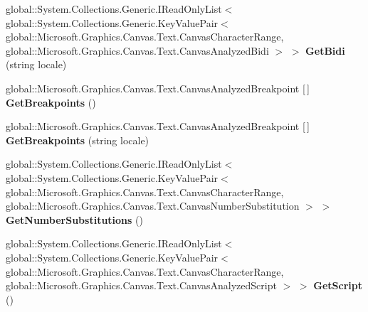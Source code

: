 \begin{DoxyCompactItemize}
global\+::\+System.\+Collections.\+Generic.\+I\+Read\+Only\+List$<$ global\+::\+System.\+Collections.\+Generic.\+Key\+Value\+Pair$<$ global\+::\+Microsoft.\+Graphics.\+Canvas.\+Text.\+Canvas\+Character\+Range, global\+::\+Microsoft.\+Graphics.\+Canvas.\+Text.\+Canvas\+Analyzed\+Bidi $>$ $>$ {\bfseries Get\+Bidi} (string locale)
\item 
\mbox{\label{interface_microsoft_1_1_graphics_1_1_canvas_1_1_text_1_1_i_canvas_text_analyzer_aae3059f7ac90b34a23ffa7061184bf59}} 
global\+::\+Microsoft.\+Graphics.\+Canvas.\+Text.\+Canvas\+Analyzed\+Breakpoint \mbox{[}$\,$\mbox{]} {\bfseries Get\+Breakpoints} ()
\item 
\mbox{\label{interface_microsoft_1_1_graphics_1_1_canvas_1_1_text_1_1_i_canvas_text_analyzer_aed1856403ffb2ff3f563c0010aeea194}} 
global\+::\+Microsoft.\+Graphics.\+Canvas.\+Text.\+Canvas\+Analyzed\+Breakpoint \mbox{[}$\,$\mbox{]} {\bfseries Get\+Breakpoints} (string locale)
\item 
\mbox{\label{interface_microsoft_1_1_graphics_1_1_canvas_1_1_text_1_1_i_canvas_text_analyzer_a6d7def9fe8d3b06fcfe8ff52672a9ded}} 
global\+::\+System.\+Collections.\+Generic.\+I\+Read\+Only\+List$<$ global\+::\+System.\+Collections.\+Generic.\+Key\+Value\+Pair$<$ global\+::\+Microsoft.\+Graphics.\+Canvas.\+Text.\+Canvas\+Character\+Range, global\+::\+Microsoft.\+Graphics.\+Canvas.\+Text.\+Canvas\+Number\+Substitution $>$ $>$ {\bfseries Get\+Number\+Substitutions} ()
\item 
\mbox{\label{interface_microsoft_1_1_graphics_1_1_canvas_1_1_text_1_1_i_canvas_text_analyzer_af6e77ce224393b7d9086c00518fe11ff}} 
global\+::\+System.\+Collections.\+Generic.\+I\+Read\+Only\+List$<$ global\+::\+System.\+Collections.\+Generic.\+Key\+Value\+Pair$<$ global\+::\+Microsoft.\+Graphics.\+Canvas.\+Text.\+Canvas\+Character\+Range, global\+::\+Microsoft.\+Graphics.\+Canvas.\+Text.\+Canvas\+Analyzed\+Script $>$ $>$ {\bfseries Get\+Script} ()
\item 
\mbox{\label{interface_microsoft_1_1_graphics_1_1_canvas_1_1_text_1_1_i_canvas_text_analyzer_a49d7a00ef1aba0f0791869b786ee7738}} 

\end{DoxyCompactItemize}
